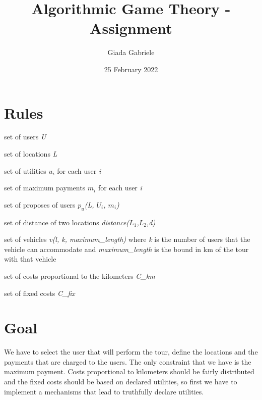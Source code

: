 \documentclass{article}
\title{Algorithmic Game Theory - Assignment}
\author{Giada Gabriele}
\date{25 February 2022}
\begin{document}
\maketitle
\section{Rules}
\begin{itemize}
\Large{
\item set of users \textit{U}
\item set of locations \textit{L}
\item set of utilities \textit{$u_i$} for each user \textit{i}
\item set of maximum payments \textit{$m_i$} for each user \textit{i}
\item set of proposes of users \textit{$p_u$(L, $U_i$, $m_i$)}
\item set of distance of two locations \textit{distance($L_1$,$L_2$,d)}
\item set of vehicles \textit{v(l, k, maximum\_length)} where \textit{k} is the number of users that the vehicle can accommodate and \textit{maximum\_length} is the bound in km of the tour with that vehicle   
}
\item set of costs proportional to the kilometers \textit{C\_km}
\item set of fixed costs \textit{C\_fix}
\end{itemize}
\section{Goal}
\Large{
We have to select the user that will perform the tour, define the locations and the payments that are charged to the users. The only constraint that we have is the maximum payment. Costs proportional to kilometers should be fairly distributed and the fixed costs should be based on declared utilities, so first we have to implement a mechanisms that lead to truthfully declare utilities.
}
\end{document}

